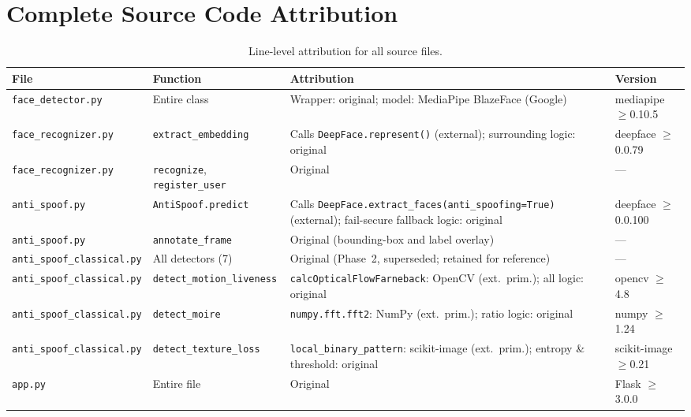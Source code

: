 \documentclass[11pt,a4paper]{article}
\begin{document}
\newpage
\appendix
\section{Complete Source Code Attribution}
\label{app:attribution}

\begin{table}[H]
\centering
\caption{Line-level attribution for all source files.}
\renewcommand{\arraystretch}{1.2}
\small\setlength{\tabcolsep}{4pt}
\begin{tabular}{@{}p{3.6cm}p{3.2cm}p{5.8cm}p{2.6cm}@{}}
\toprule
\textbf{File} & \textbf{Function} & \textbf{Attribution} & \textbf{Version} \\
\midrule
\texttt{face\_detector.py}
  & Entire class
  & Wrapper: original; model: MediaPipe BlazeFace (Google)
  & mediapipe $\geq$0.10.5 \\[3pt]
\texttt{face\_recognizer.py}
  & \texttt{extract\_\allowbreak{}embedding}
  & Calls \texttt{DeepFace.\allowbreak{}represent()} (external); surrounding logic: original
  & deepface $\geq$0.0.79 \\[3pt]
\texttt{face\_recognizer.py}
  & \texttt{recognize}, \texttt{register\_\allowbreak{}user}
  & Original
  & --- \\[3pt]
\texttt{anti\_spoof.py}
  & \texttt{AntiSpoof.predict}
  & Calls \texttt{DeepFace.extract\_faces(anti\_spoofing=True)} (external); fail-secure fallback logic: original
  & deepface $\geq$0.0.100 \\[3pt]
\texttt{anti\_spoof.py}
  & \texttt{annotate\_frame}
  & Original (bounding-box and label overlay)
  & --- \\[3pt]
\texttt{anti\_spoof\_\allowbreak{}classical.py}
  & All detectors (7)
  & Original (Phase~2, superseded; retained for reference)
  & --- \\[3pt]
\texttt{anti\_spoof\_\allowbreak{}classical.py}
  & \texttt{detect\_motion\_\allowbreak{}liveness}
  & \texttt{calcOpticalFlow\-Farneback}: OpenCV (ext.\ prim.); all logic: original
  & opencv $\geq$4.8 \\[3pt]
\texttt{anti\_spoof\_\allowbreak{}classical.py}
  & \texttt{detect\_moire}
  & \texttt{numpy.fft.fft2}: NumPy (ext.\ prim.); ratio logic: original
  & numpy $\geq$1.24 \\[3pt]
\texttt{anti\_spoof\_\allowbreak{}classical.py}
  & \texttt{detect\_texture\_\allowbreak{}loss}
  & \texttt{local\_binary\_\allowbreak{}pattern}: scikit-image (ext.\ prim.); entropy \& threshold: original
  & scikit-image $\geq$0.21 \\[3pt]
\texttt{app.py}
  & Entire file
  & Original
  & Flask $\geq$3.0.0 \\
\bottomrule
\end{tabular}
\end{table}
\end{document}
